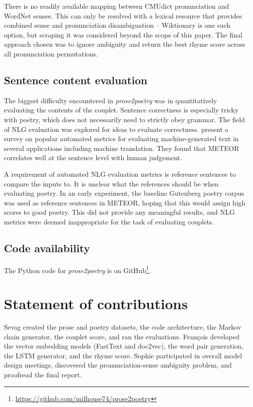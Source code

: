 \documentclass[11pt,a4paper]{article}
\begin{document}
There is no readily available mapping between CMUdict pronunciation and WordNet senses. This can only be resolved with a lexical resource that provides combined sense and pronunciation disambiguation -- Wiktionary \cite{wiktionary} is one such option, but scraping it was considered beyond the scope of this paper. The final approach chosen was to ignore ambiguity and return the best rhyme score across all pronunciation permutations.

\subsection{Sentence content evaluation}
\label{sec:nlg}

The biggest difficulty encountered in \textit{prose2poetry} was in quantitatively evaluating the contents of the couplet. Sentence correctness is especially tricky with poetry, which does not necessarily need to strictly obey grammar. The field of NLG evaluation was explored for ideas to evaluate correctness. \citet{nlgeval} present a survey on popular automated metrics for evaluating machine-generated text in several applications including machine translation. They found that METEOR \cite{meteor} correlates well at the sentence level with human judgement.

A requirement of automated NLG evaluation metrics is reference sentences to compare the inputs to. It is unclear what the references should be when evaluating poetry. In an early experiment, the baseline Gutenberg poetry corpus was used as reference sentences in METEOR, hoping that this would assign high scores to good poetry. This did not provide any meaningful results, and NLG metrics were deemed inappropriate for the task of evaluating couplets.

\subsection{Code availability}

The Python code for \textit{prose2poetry} is on GitHub\footnote{\href{https://github.com/milhouse74/prose2poetry}{https://github.com/milhouse74/prose2poetry}}.

\section{Statement of contributions}
\label{sec:contributions}
Sevag created the prose and poetry datasets, the code architecture, the Markov chain generator, the couplet score, and ran the evaluations. François developed the vector embedding models (FastText and doc2vec), the word pair generation, the LSTM generator, and the rhyme score. Sophie participated in overall model design meetings, discovered the pronunciation-sense ambiguity problem, and proofread the final report.

\vfill
\clearpage %



\end{document}
